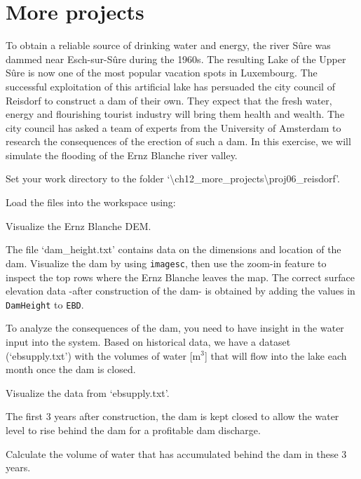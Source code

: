 \chapter{More projects}
\thispagestyle{fancy}
\label{ch:more-projects}


\label{pr:reisdorf}
To obtain a reliable source of drinking water and energy, the river S\^{u}re was dammed near Esch-sur-S\^{u}re during the 1960s. The resulting Lake of the Upper S\^{u}re is now one of the most popular vacation spots in Luxembourg. The successful exploitation of this artificial lake has persuaded the city council of Reisdorf to construct a dam of their own. They expect that the fresh water, energy and flourishing tourist industry will bring them health and wealth. The city council has asked a team of experts from the University of Amsterdam to research the consequences of the erection of such a dam. In this exercise, we will simulate the flooding of the Ernz Blanche river valley.
\begin{action}
Set your work directory to the folder `\textbackslash{}ch12\_more\_projects\textbackslash{}proj06\_reisdorf'. 
\end{action}
\begin{action}
Load the files into the workspace using:
\end{action}

\begin{action}
Visualize the Ernz Blanche DEM. 
\end{action}
\begin{action}
The file `dam\_height.txt' contains data on the dimensions and location of the dam. Visualize the dam by using {\tt imagesc}, then use the zoom-in feature to inspect the top rows where the Ernz Blanche leaves the map. The correct surface elevation data -after construction of the dam- is obtained by adding the values in {\tt DamHeight} to {\tt EBD}.  
\end{action}
To analyze the consequences of the dam, you need to have insight in the water input into the system. Based on historical data, we have a dataset (`ebsupply.txt') with the volumes of water [m$^{3}$] that will flow into the lake each month once the dam is closed. 
\begin{action}
Visualize the data from `ebsupply.txt'.
\end{action}
The first 3 years after construction, the dam is kept closed to allow the water level to rise behind the dam for a profitable dam discharge.
\begin{action}
Calculate the volume of water that has accumulated behind the dam in these 3 years.
\end{action}
